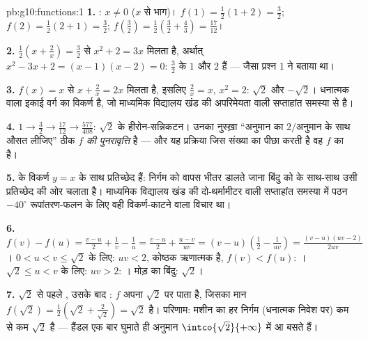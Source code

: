 \begin{solution}{pb:g10:functions:1}
\textbf{1.} : $x \neq 0$ ($x$ से भाग)। $f(1) =
\frac12(1 + 2) = \frac32$; $f(2) = \frac12(2 + 1) = \frac32$; $f\!\left(\frac32\right) = \frac12\left(\frac32 +
\frac43\right) = \frac{17}{12}$।

\textbf{2.} $\frac12\left(x + \frac2x\right) = \frac32$ से $x^2 + 2 = 3x$ मिलता है, अर्थात् $x^2 - 3x + 2 = (x - 1)(x - 2) = 0$: $\frac32$ के
 $1$ और $2$ हैं --- जैसा प्रश्न 1 ने बताया था।

\textbf{3.} $f(x) = x$ से $x + \frac2x = 2x$ मिलता है, इसलिए $\frac2x = x$, $x^2 = 2$:  $\sqrt2$
और $-\sqrt2$। धनात्मक वाला इकाई वर्ग का विकर्ण है, जो माध्यमिक विद्यालय खंड की
अपरिमेयता वाली सप्ताहांत समस्या से  है।

\textbf{4.} $1 \to \frac32 \to \frac{17}{12} \to
\frac{577}{408}$: $\sqrt2$ के हीरोन-सन्निकटन। उनका नुस्ख़ा ``अनुमान का
$2/$अनुमान के साथ औसत लीजिए'' ठीक \emph{ $f$ की पुनरावृत्ति} है ---
और यह प्रक्रिया जिस संख्या का पीछा करती है वह $f$ का  है।

\textbf{5.}   के विकर्ण $y = x$ के साथ प्रतिच्छेद हैं: निर्गम
को वापस भीतर डालते जाना बिंदु को  के साथ-साथ उसी प्रतिच्छेद की ओर चलाता
है। माध्यमिक विद्यालय खंड की दो-थर्मामीटर वाली सप्ताहांत समस्या में पठन
$-40^\circ$ रूपांतरण-फलन के लिए वही विकर्ण-काटने वाला विचार था।

\textbf{6.} $f(v) - f(u) = \frac{v - u}{2} + \frac1v - \frac1u
= \frac{v - u}{2} + \frac{u - v}{uv}
= (v - u)\left(\frac12 - \frac{1}{uv}\right)
= \frac{(v - u)(uv - 2)}{2uv}$। $0 < u < v \leq \sqrt2$ के लिए: $uv < 2$, कोष्ठक ऋणात्मक है, $f(v) < f(u)$: ।
$\sqrt2 \leq u < v$ के लिए: $uv > 2$: । मोड़ का बिंदु: $\sqrt2$।

\textbf{7.} $\sqrt2$ से पहले , उसके बाद : $f$ अपना 
$\sqrt2$ पर पाता है, जिसका मान $f(\sqrt2) = \frac12\left(\sqrt2 + \frac{2}{\sqrt2}\right)
= \sqrt2$ है। परिणाम: मशीन का हर निर्गम (धनात्मक
निवेश पर) कम से कम $\sqrt2$ है --- हैंडल एक बार घुमाते ही अनुमान $\intco{\sqrt2}{+\infty}$ में आ
बसते हैं।


\end{solution}
